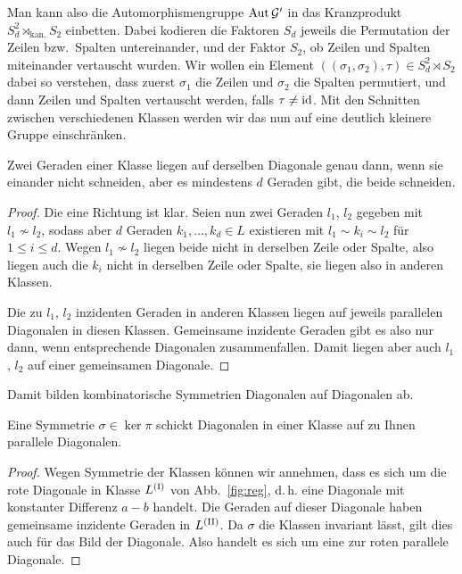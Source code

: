 Man kann also die Automorphismengruppe $\operatorname{Aut} \mathcal G'$ in das Kranzprodukt $S_d^2 \rtimes_{\text{kan.}} S_2$ einbetten. Dabei kodieren die Faktoren $S_d$ jeweils die Permutation der Zeilen bzw.~Spalten untereinander, und der Faktor $S_2$, ob Zeilen und Spalten miteinander vertauscht wurden. Wir wollen ein Element $((\sigma_1, \sigma_2), \tau) \in S_d^2 \rtimes S_2$ dabei so verstehen, dass zuerst $\sigma_1$ die Zeilen und $\sigma_2$ die Spalten permutiert, und dann Zeilen und Spalten vertauscht werden, falls $\tau \neq \operatorname{id}$. Mit den Schnitten zwischen verschiedenen Klassen werden wir das nun auf eine deutlich kleinere Gruppe einschränken.
\begin{prop}
Zwei Geraden einer Klasse liegen auf derselben Diagonale genau dann, wenn sie einander nicht schneiden, aber es mindestens $d$ Geraden gibt, die beide schneiden.
\end{prop}
\begin{proof}
Die eine Richtung ist klar. Seien nun zwei Geraden $l_1$, $l_2$ gegeben mit $l_1 \not\sim l_2$, sodass aber $d$ Geraden $k_1, \dots, k_d \in L$ existieren mit $l_1 \sim k_i \sim l_2$ für $1 \leq i \leq d$. Wegen $l_1 \not\sim l_2$ liegen beide nicht in derselben Zeile oder Spalte, also liegen auch die $k_i$ nicht in derselben Zeile oder Spalte, sie liegen also in anderen Klassen.

Die zu $l_1$, $l_2$ inzidenten Geraden in anderen Klassen liegen auf jeweils parallelen Diagonalen in diesen Klassen. Gemeinsame inzidente Geraden gibt es also nur dann, wenn entsprechende Diagonalen zusammenfallen. Damit liegen aber auch $l_1$, $l_2$ auf einer gemeinsamen Diagonale.
\end{proof}
\begin{coroll}
Damit bilden kombinatorische Symmetrien Diagonalen auf Diagonalen ab.
\end{coroll}
\begin{prop}
Eine Symmetrie $\sigma \in \ker \pi$ schickt Diagonalen in einer Klasse auf zu Ihnen parallele Diagonalen.
\end{prop}
\begin{proof}
Wegen Symmetrie der Klassen können wir annehmen, dass es sich um die rote Diagonale in Klasse $\Lcl(I)$ von Abb.~\ref{fig:reg}, d.\,h. eine Diagonale mit konstanter Differenz $a-b$ handelt. Die Geraden auf dieser Diagonale haben gemeinsame inzidente Geraden in $\Lcl(II)$. Da $\sigma$ die Klassen invariant lässt, gilt dies auch für das Bild der Diagonale. Also handelt es sich um eine zur roten parallele Diagonale.
\end{proof}

